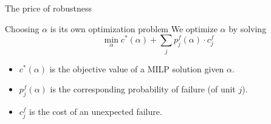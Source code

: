 \documentclass[slides]{beamer}
\begin{document}
\begin{frame}{The price of robustness}
    \centering
    
\end{frame}


\begin{frame}{Choosing $\alpha$ is its own optimization problem}
     We optimize $\alpha$ by solving
    \begin{equation*}
    \min_{\alpha} c^*(\alpha) + \sum_{j} p^f_{j}(\alpha)\cdot c_{j}^f
    \end{equation*}
    \begin{itemize}
        \item $c^*(\alpha)$ is the objective value of a MILP solution given $\alpha$.
        \item $p^f_j(\alpha)$ is the corresponding probability of failure (of
            unit $j$).
        \item $c_j^f$ is the cost of an unexpected failure.
    \end{itemize}
\end{frame}
\end{document}
